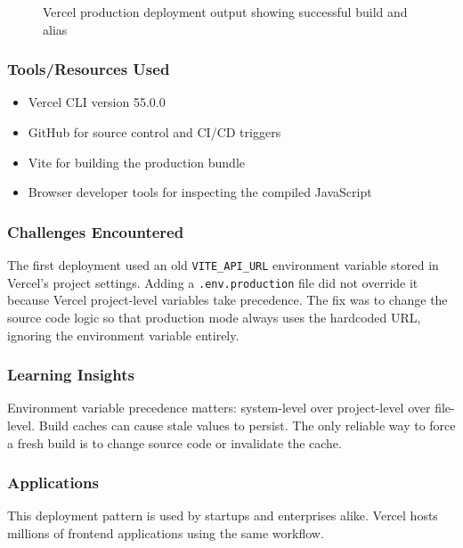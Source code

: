 \documentclass[12pt,a4paper]{article}
\begin{document}
\begin{figure}[H]
    \centering
    \caption{Vercel production deployment output showing successful build and alias}
    \label{fig:vercel_deploy}
\end{figure}

\subsubsection*{Tools/Resources Used}
\begin{itemize}
    \item Vercel CLI version 55.0.0
    \item GitHub for source control and CI/CD triggers
    \item Vite for building the production bundle
    \item Browser developer tools for inspecting the compiled JavaScript
\end{itemize}

\subsubsection*{Challenges Encountered}
The first deployment used an old \texttt{VITE\_API\_URL} environment variable stored in Vercel's project settings. Adding a \texttt{.env.production} file did not override it because Vercel project-level variables take precedence. The fix was to change the source code logic so that production mode always uses the hardcoded URL, ignoring the environment variable entirely.

\subsubsection*{Learning Insights}
Environment variable precedence matters: system-level over project-level over file-level. Build caches can cause stale values to persist. The only reliable way to force a fresh build is to change source code or invalidate the cache.

\subsubsection*{Applications}
This deployment pattern is used by startups and enterprises alike. Vercel hosts millions of frontend applications using the same workflow.
\end{document}
